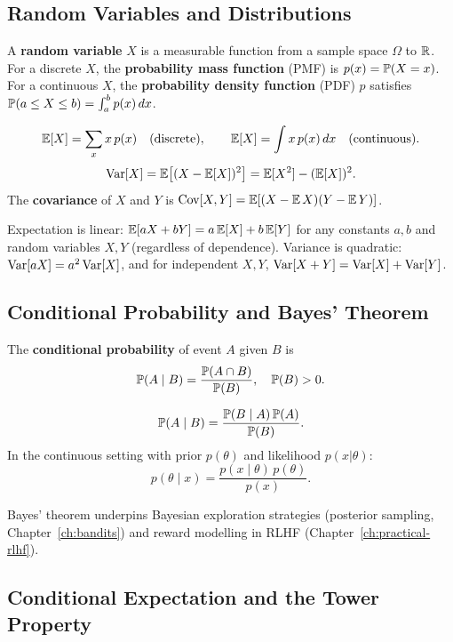 \subsection*{Random Variables and Distributions}

A \textbf{random variable} $X$ is a measurable function from a sample
space $\Omega$ to $\mathbb{R}$.  For a discrete $X$, the \textbf{probability mass
function} (PMF) is $p(x) = \mathbb{P}(X=x)$.  For a continuous $X$, the
\textbf{probability density function} (PDF) $p$ satisfies
$\mathbb{P}(a \leq X \leq b) = \int_a^b p(x)\,dx$.

\begin{definition}
\label{def:expectation}
\[
    \operatorname{\mathbb{E}}[X] = \sum_x x\,p(x) \quad\text{(discrete)}, \qquad
    \operatorname{\mathbb{E}}[X] = \int x\,p(x)\,dx \quad\text{(continuous)}.
\]
\[
    \operatorname{Var}[X] = \operatorname{\mathbb{E}}\!\left[(X - \operatorname{\mathbb{E}}[X])^2\right] = \operatorname{\mathbb{E}}[X^2] - (\operatorname{\mathbb{E}}[X])^2.
\]
The \textbf{covariance} of $X$ and $Y$ is
$\operatorname{Cov}[X,Y] = \operatorname{\mathbb{E}}[(X-\operatorname{\mathbb{E}} X)(Y-\operatorname{\mathbb{E}} Y)]$.
\end{definition}

Expectation is linear: $\operatorname{\mathbb{E}}[aX + bY] = a\operatorname{\mathbb{E}}[X] + b\operatorname{\mathbb{E}}[Y]$ for any constants
$a, b$ and random variables $X, Y$ (regardless of dependence).  Variance
is quadratic: $\operatorname{Var}[aX] = a^2 \operatorname{Var}[X]$, and for independent $X, Y$,
$\operatorname{Var}[X+Y] = \operatorname{Var}[X] + \operatorname{Var}[Y]$.

\subsection*{Conditional Probability and Bayes' Theorem}

The \textbf{conditional probability} of event $A$ given $B$ is
\[
    \mathbb{P}(A \mid B) = \frac{\mathbb{P}(A \cap B)}{\mathbb{P}(B)}, \quad \mathbb{P}(B) > 0.
\]

\begin{theorem}
\label{thm:bayes}
\[
    \mathbb{P}(A \mid B) = \frac{\mathbb{P}(B \mid A)\,\mathbb{P}(A)}{\mathbb{P}(B)}.
\]
In the continuous setting with prior $p(\theta)$ and likelihood $p(x|\theta)$:
\[
    p(\theta \mid x) = \frac{p(x \mid \theta)\,p(\theta)}{p(x)}.
\]
\end{theorem}

Bayes' theorem underpins Bayesian exploration strategies (posterior
sampling, Chapter~\ref{ch:bandits}) and reward modelling in RLHF
(Chapter~\ref{ch:practical-rlhf}).

\subsection*{Conditional Expectation and the Tower Property}

